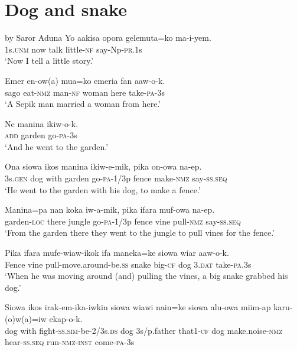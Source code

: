 \setcounter{equation}{0}
\section{ Dog and snake}
  by Saror Aduna
\ea
\gll  Yo  aakisa  opora  gelemuta=ko  ma-i-yem. \\
1s.\textsc{unm}  now  talk  little-\textsc{nf}  say-Np-\textsc{pr}.1s \\
\glt ‘Now I tell a little story.’ \\
\z


\ea
\gll  Emer  en-ow(a)  mua=ko  emeria  fan  aaw-o-k. \\
sago  eat-\textsc{nmz}  man-\textsc{nf}  woman  here  take-\textsc{pa}-3s \\
\glt ‘A Sepik man married a woman from here.’ \\
\z


\ea
\gll  Ne  manina  ikiw-o-k. \\
\textsc{add}  garden  go-\textsc{pa}-3s \\
\glt ‘And he went to the garden.’ \\
\z


\ea
\gll  Ona  siowa  ikos  manina  ikiw-e-mik,  pika  on-owa  na-ep. \\
3s.\textsc{gen}  dog  with  garden  go-\textsc{pa}-1/3p  fence  make-\textsc{nmz}  say-\textsc{ss.seq} \\
\glt ‘He went to the garden with his dog, to make a fence.’ \\
\z


\ea
\gll  Manina=pa  nan  koka  iw-a-mik,  pika  ifara  muf-owa  na-ep. \\
garden-\textsc{loc}  there  jungle  go-\textsc{pa}-1/3p  fence  vine  pull-\textsc{nmz}  say-\textsc{ss.seq} \\
\glt ‘From the garden there they went to the jungle to pull vines for the fence.’ \\
\z


\ea
\gll  Pika  ifara  mufe-wiaw-ikok  ifa  maneka=ke  siowa  wiar  aaw-o-k. \\
Fence  vine  pull-move.around-be.\textsc{ss}  snake  big-\textsc{cf}  dog  3.\textsc{dat}  take-\textsc{pa}.3s \\
\glt ‘When he was moving around (and) pulling the vines, a big snake grabbed his dog.’ \\
\z


\ea
\gll  Siowa  ikos  irak-em-ika-iwkin  siowa  wiawi  nain=ke    siowa  alu-owa  miim-ap  karu-(o)w(a)=iw  ekap-o-k. \\
dog  with  fight-\textsc{ss}.\textsc{sim}-be-2/3s.\textsc{ds}  dog  3s/p.father  that1-\textsc{cf} dog  make.noise-\textsc{nmz}  hear-\textsc{ss.seq}  run-\textsc{nmz}-\textsc{inst}  come-\textsc{pa}-3s \\


